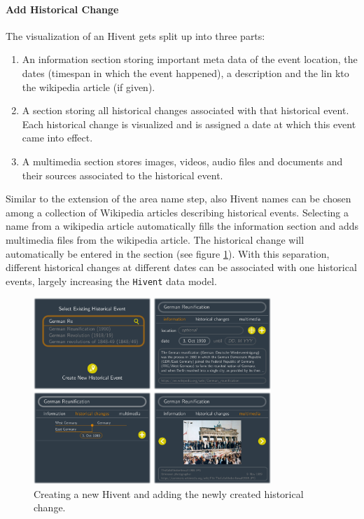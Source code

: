 

\paragraph{Add Historical Change} %
\label{par:add_historical_change}

The visualization of an Hivent gets split up into three parts:

\begin{enumerate}
  \item An information section storing important meta data of the event location, the dates (timespan in which the event happened), a description and the lin kto the wikipedia article (if given).
  \item A section storing all historical changes associated with that historical event. Each historical change is visualized and is assigned a date at which this event came into effect.
  \item A multimedia section stores images, videos, audio files and documents and their sources associated to the historical event.
\end{enumerate}

Similar to the extension of the area name step, also Hivent names can be chosen among a collection of Wikipedia articles describing historical events. Selecting a name from a wikipedia article automatically fills the information section and adds multimedia files from the wikipedia article. The historical change will automatically be entered in the section (see figure \ref{fig:uncertainty_new_hivent_box}). With this separation, different historical changes at different dates can be associated with one historical events, largely increasing the \texttt{Hivent} data model.

\begin{figure}[H]
  \centering
  \includegraphics[width = 0.8\textwidth]{graphics/uncertainty/new_hivent_box}
  \caption{Creating a new Hivent and adding the newly created historical change.}
  \label{fig:uncertainty_new_hivent_box}
\end{figure}

